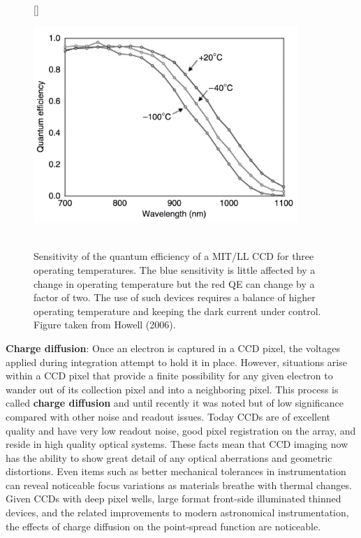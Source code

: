 \documentclass[a4paper,10pt]{article}
\begin{document}
\begin{figure}[t]
    [\FBwidth]
    {\caption{\footnotesize{\\Sensitivity of the quantum efficiency of a MIT/LL CCD for three operating temperatures. The blue sensitivity is little affected by a change in operating temperature but the red QE can change by a factor of two. The use of such devices requires a balance of higher operating temperature and keeping the dark current under control. Figure taken from Howell (2006).}}
    \label{fig:qetemp}}
    {\includegraphics[width=10cm]{figures/QE_temp.png}}
\end{figure}

{\noindent}\textbf{Charge diffusion}: Once an electron is captured in a CCD pixel, the voltages applied during integration attempt to hold it in place. However, situations arise within a CCD pixel that provide a finite possibility for any given electron to wander out of its collection pixel and into a neighboring pixel. This process is called \textbf{charge diffusion} and until recently it was noted but of low significance compared with other noise and readout issues. Today CCDs are of excellent quality and have very low readout noise, good pixel registration on the array, and reside in high quality optical systems. These facts mean that CCD imaging now has the ability to show great detail of any optical aberrations and geometric distortions. Even items such as better mechanical tolerances in instrumentation can reveal noticeable focus variations as materials breathe with thermal changes. Given CCDs with deep pixel wells, large format front-side illuminated thinned devices, and the related improvements to modern astronomical instrumentation, the effects of charge diffusion on the point-spread function are noticeable.
\end{document}
